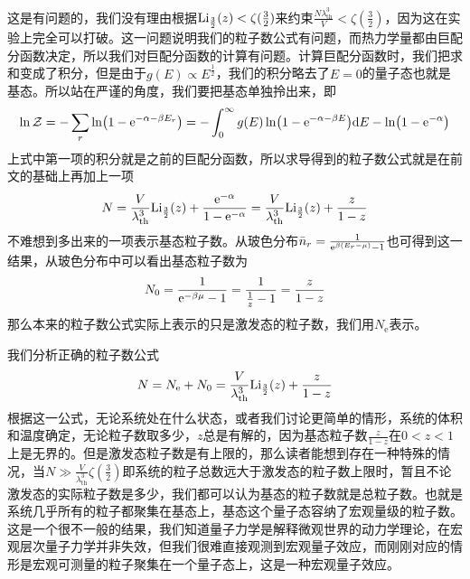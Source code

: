 \documentclass[../../main.tex]{subfiles}
\begin{document}
这是有问题的，我们没有理由根据\(\mathrm{Li}_{\frac{3}{2}}(z)<\zeta(\frac{3}{2})\)来约束\(\frac{N\lambda_{\mathrm{th}}^3}{V}<\zeta(\frac{3}{2})\)，因为这在实验上完全可以打破。这一问题说明我们的粒子数公式有问题，而热力学量都由巨配分函数决定，所以我们对巨配分函数的计算有问题。计算巨配分函数时，我们把求和变成了积分，但是由于\(g(E)\propto E^\frac{1}{2}\)，我们的积分略去了\(E=0\)的量子态也就是基态。所以站在严谨的角度，我们要把基态单独拎出来，即
\begin{equation}
    \ln\mathcal{Z}=-\sum_r \ln(1-\mathrm{e}^{-\alpha-\beta E_r})=-\int_0^{\infty}g(E)\ln(1-\mathrm{e}^{-\alpha-\beta E})\dd E-\ln(1-\mathrm{e}^{-\alpha})
\end{equation}
上式中第一项的积分就是之前的巨配分函数，所以求导得到的粒子数公式就是在前文的基础上再加上一项
\begin{equation}
    N=\frac{V}{\lambda_{\mathrm{th}}^3}\mathrm{Li}_{\frac{3}{2}}(z)+\frac{\mathrm{e}^{-\alpha}}{1-\mathrm{e}^{-\alpha}}=\frac{V}{\lambda_{\mathrm{th}}^3}\mathrm{Li}_{\frac{3}{2}}(z)+\frac{z}{1-z}
\end{equation}
不难想到多出来的一项表示基态粒子数。从玻色分布\(\bar{n}_r=\frac{1}{\mathrm{e}^{\beta(E_r-\mu)}-1}\)也可得到这一结果，从玻色分布中可以看出基态粒子数为
\begin{equation}
    N_0=\frac{1}{\mathrm{e}^{-\beta\mu}-1}=\frac{1}{\frac{1}{z}-1}=\frac{z}{1-z}
\end{equation}
那么本来的粒子数公式实际上表示的只是激发态的粒子数，我们用\(N_{\mathrm{e}}\)表示。

我们分析正确的粒子数公式
\begin{equation}\label{eq:玻色气体正确粒子数公式}
    N=N_{\mathrm{e}}+N_0=\frac{V}{\lambda_{\mathrm{th}}^3}\mathrm{Li}_{\frac{3}{2}}(z)+\frac{z}{1-z}
\end{equation}
根据这一公式，无论系统处在什么状态，或者我们讨论更简单的情形，系统的体积和温度确定，无论粒子数取多少，\(z\)总是有解的，因为基态粒子数\(\frac{z}{1-z}\)在\(0<z<1\)上是无界的。但是激发态粒子数是有上限的，那么读者能想到存在一种特殊的情况，当\(N\gg \frac{V}{\lambda_{\mathrm{th}}^3}\zeta(\frac{3}{2})\)即系统的粒子总数远大于激发态的粒子数上限时，暂且不论激发态的实际粒子数是多少，我们都可以认为基态的粒子数就是总粒子数。也就是系统几乎所有的粒子都聚集在基态上，基态这个量子态容纳了宏观量级的粒子数。这是一个很不一般的结果，我们知道量子力学是解释微观世界的动力学理论，在宏观层次量子力学并非失效，但我们很难直接观测到宏观量子效应，而刚刚对应的情形是宏观可测量的粒子聚集在一个量子态上，这是一种宏观量子效应。
\end{document}

